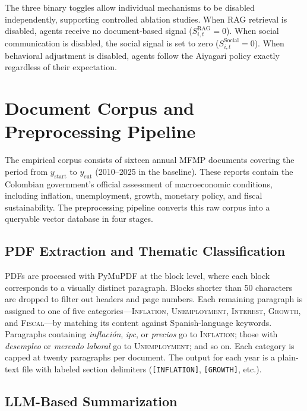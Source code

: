The three binary toggles allow individual mechanisms to be disabled independently, supporting controlled ablation studies. When RAG retrieval is disabled, agents receive no document-based signal ($S^{\text{RAG}}_{i,t} = 0$). When social communication is disabled, the social signal is set to zero ($S^{\text{Social}}_{i,t} = 0$). When behavioral adjustment is disabled, agents follow the Aiyagari policy exactly regardless of their expectation.

\section{Document Corpus and Preprocessing Pipeline}
\label{sec:pipeline}

The empirical corpus consists of sixteen annual MFMP documents covering the period from $y_{\text{start}}$ to $y_{\text{cut}}$ (2010--2025 in the baseline). These reports contain the Colombian government's official assessment of macroeconomic conditions, including inflation, unemployment, growth, monetary policy, and fiscal sustainability. The preprocessing pipeline converts this raw corpus into a queryable vector database in four stages.

\subsection{PDF Extraction and Thematic Classification}

PDFs are processed with PyMuPDF at the block level, where each block corresponds to a visually distinct paragraph. Blocks shorter than 50 characters are dropped to filter out headers and page numbers. Each remaining paragraph is assigned to one of five categories---\textsc{Inflation}, \textsc{Unemployment}, \textsc{Interest}, \textsc{Growth}, and \textsc{Fiscal}---by matching its content against Spanish-language keywords. Paragraphs containing \textit{inflación}, \textit{ipc}, or \textit{precios} go to \textsc{Inflation}; those with \textit{desempleo} or \textit{mercado laboral} go to \textsc{Unemployment}; and so on. Each category is capped at twenty paragraphs per document. The output for each year is a plain-text file with labeled section delimiters (\texttt{[INFLATION]}, \texttt{[GROWTH]}, etc.).

\subsection{LLM-Based Summarization}


